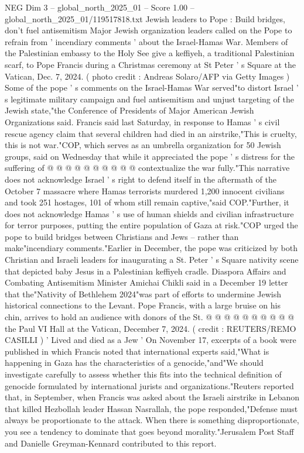 \begin{textsample}{NEG Dim 3 – global\_north\_2025\_01 – Score 1.00 – global\_north\_2025\_01/119517818.txt}  \label{ex:f3_neg_215}
Jewish leaders to Pope : Build bridges, don't fuel antisemitism Major Jewish organization leaders called on the Pope to refrain from ' incendiary comments ' about the Israel-Hamas War.
Members of the Palestinian embassy to the Holy See give a keffiyeh, a traditional Palestinian scarf, to Pope Francis during a Christmas ceremony at St Peter ' s Square at the Vatican, Dec. 7, 2024. ( photo credit : Andreas Solaro/AFP via Getty Images ) Some of the pope ' s comments on the Israel-Hamas War served"to distort Israel ' s legitimate military campaign and fuel antisemitism and unjust targeting of the Jewish state,"the Conference of Presidents of Major American Jewish Organizations said.
Francis said last Saturday, in response to Hamas ' s civil rescue agency claim that several children had died in an airstrike,"This is cruelty, this is not war."COP, which serves as an umbrella organization for 50 Jewish groups, said on Wednesday that while it appreciated the pope ' s distress for the suffering of @ @ @ @ @ @ @ @ @ @ contextualize the war fully."This narrative does not acknowledge Israel ' s right to defend itself in the aftermath of the October 7 massacre where Hamas terrorists murdered 1,200 innocent civilians and took 251 hostages, 101 of whom still remain captive,"said COP."Further, it does not acknowledge Hamas ' s use of human shields and civilian infrastructure for terror purposes, putting the entire population of Gaza at risk."COP urged the pope to build bridges between Christians and Jews -- rather than make"incendiary comments."Earlier in December, the pope was criticized by both Christian and Israeli leaders for inaugurating a St.
Peter ' s Square nativity scene that depicted baby Jesus in a Palestinian keffiyeh cradle.
Diaspora Affairs and Combating Antisemitism Minister Amichai Chikli said in a December 19 letter that the"Nativity of Bethlehem 2024"was part of efforts to undermine Jewish historical connections to the Levant.
Pope Francis, with a large bruise on his chin, arrives to hold an audience with donors of the St. @ @ @ @ @ @ @ @ @ @ the Paul VI Hall at the Vatican, December 7, 2024. ( credit : REUTERS/REMO CASILLI ) ' Lived and died as a Jew ' On November 17, excerpts of a book were published in which Francis noted that international experts said,"What is happening in Gaza has the characteristics of a genocide,"and"We should investigate carefully to assess whether this fits into the technical definition of genocide formulated by international jurists and organizations."Reuters reported that, in September, when Francis was asked about the Israeli airstrike in Lebanon that killed Hezbollah leader Hassan Nasrallah, the pope responded,"Defense must always be proportionate to the attack.
When there is something disproportionate, you see a tendency to dominate that goes beyond morality."Jerusalem Post Staff and Danielle Greyman-Kennard contributed to this report.

\end{textsample}
